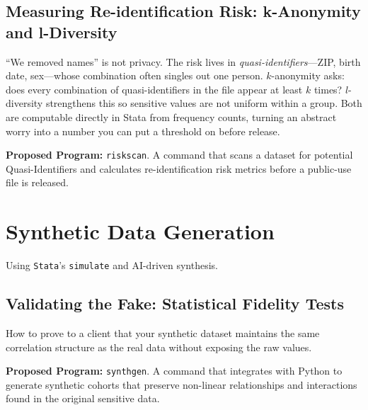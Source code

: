 \documentclass[
    a4paper,
    fontsize=10pt,
    twoside=true,
    numbers=noenddot,
]{kaobook}
\providecommand{\Environment}[1]{\texttt{#1}}
\begin{document}
\subsection{Measuring Re-identification Risk: k-Anonymity and l-Diversity}
\enquote{We removed names} is not privacy. The risk lives in \emph{quasi-identifiers}---ZIP, birth date, sex---whose combination often singles out one person. $k$-anonymity asks: does every combination of quasi-identifiers in the file appear at least $k$ times? $l$-diversity strengthens this so sensitive values are not uniform within a group. Both are computable directly in Stata from frequency counts, turning an abstract worry into a number you can put a threshold on before release.

\begin{kaobox}[frametitle=Ado-file Idea: \texttt{riskscan}]
\textbf{Proposed Program:} \texttt{riskscan}. A command that scans a dataset for potential Quasi-Identifiers and calculates re-identification risk metrics before a public-use file is released.
\end{kaobox}

\section{Synthetic Data Generation}
Using \Environment{Stata}'s \texttt{simulate} and AI-driven synthesis.

\subsection{Validating the Fake: Statistical Fidelity Tests}
How to prove to a client that your synthetic dataset maintains the same correlation structure as the real data without exposing the raw values.

\begin{kaobox}[frametitle=Ado-file Idea: \texttt{synthgen}]
\textbf{Proposed Program:} \texttt{synthgen}. A command that integrates with Python to generate synthetic cohorts that preserve non-linear relationships and interactions found in the original sensitive data.
\end{kaobox}


\end{document}
